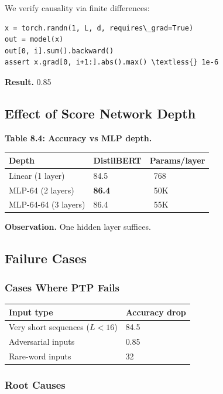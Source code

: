 We verify causality via finite differences:

\begin{lstlisting}
x = torch.randn(1, L, d, requires\_grad=True)
out = model(x)
out[0, i].sum().backward()
assert x.grad[0, i+1:].abs().max() \textless{} 1e-6
\end{lstlisting}

\textbf{Result.} 0.85

\subsection{Effect of Score Network Depth}

\textbf{Table 8.4: Accuracy vs MLP depth.}

\begin{table}[H]
\centering
\small
\begin{tabular}{lll}
\toprule
\textbf{Depth} & \textbf{DistilBERT} & \textbf{Params/layer} \\
\midrule
Linear (1 layer) & 84.5 & ~768 \\
MLP-64 (2 layers) & \textbf{86.4} & ~50K \\
MLP-64-64 (3 layers) & 86.4 & ~55K \\
\bottomrule
\end{tabular}
\end{table}

\textbf{Observation.} One hidden layer suffices.

\subsection{Failure Cases}

\subsubsection{Cases Where PTP Fails}

\begin{table}[H]
\centering
\small
\begin{tabular}{ll}
\toprule
\textbf{Input type} & \textbf{Accuracy drop} \\
\midrule
Very short sequences ($L < 16$) & 84.5 \\
Adversarial inputs & 0.85 \\
Rare-word inputs & 32 \\
\bottomrule
\end{tabular}
\end{table}

\subsubsection{Root Causes}

